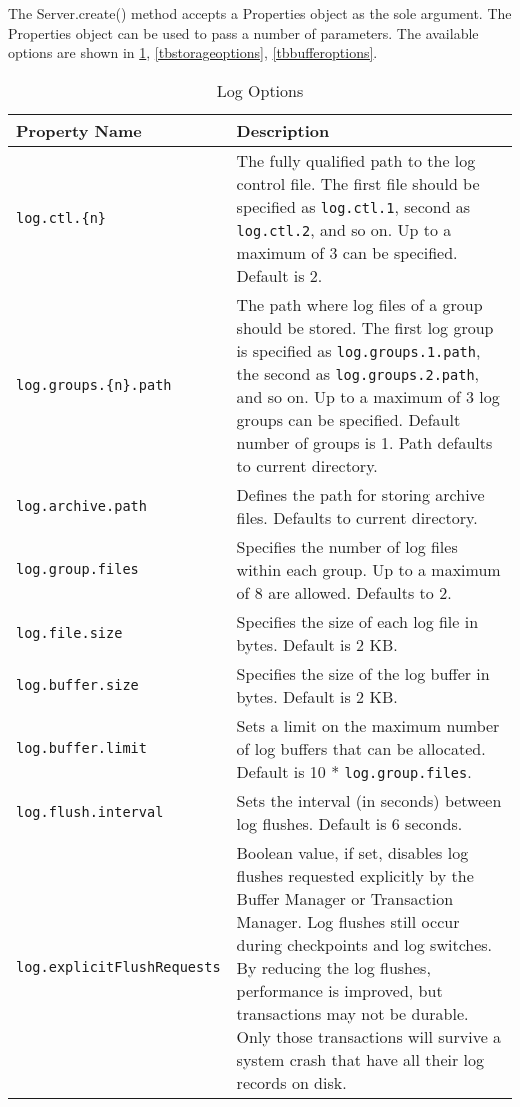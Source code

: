 \documentclass[a4paper,draft,oneside]{book}
\begin{document}
The Server.create() method accepts a Properties object as
the sole argument. The Properties object can be used to pass a
number of parameters. The available options are shown in
\ref{tblogoptions}, \ref{tbstorageoptions}, \ref{tbbufferoptions}. 

\clearpage
\begin{table}[tbp]
\begin{center}
\begin{tabular}{|l|p{6cm}|}
  \hline
  \textbf{Property Name}&\textbf{Description}  \\
  \hline 
  \verb|log.ctl.{n}|&The fully qualified path to the
  log control file. The first file should be specified as
  \verb|log.ctl.1|, second as \verb|log.ctl.2|, and so on. Up to a
  maximum of 3 can be specified. Default is 2. \\
  \hline
  \verb|log.groups.{n}.path|&The path where log
  files of a group should be stored. The first log group is specified
  as \verb|log.groups.1.path|, the second as \verb|log.groups.2.path|,
  and so on. Up to a maximum of 3 log groups can be specified. Default
  number of groups is 1. Path defaults to current directory.  \\
  \hline
  \verb|log.archive.path|&Defines the path for storing archive files. 
  Defaults to current directory.  \\
  \hline
  \verb|log.group.files|&Specifies the number of log files within each group.
  Up to a maximum of 8 are allowed. Defaults to 2. \\
  \hline 
  \verb|log.file.size|&Specifies the size of each log file in
  bytes. Default is 2 KB. \\
  \hline 
  \verb|log.buffer.size|&Specifies the size of the log buffer
  in bytes. Default is 2 KB. \\
  \hline 
  \verb|log.buffer.limit|&Sets a limit on the maximum number of
  log buffers that can be allocated. Default is 10 *
  \verb|log.group.files|.  \\
  \hline 
  \verb|log.flush.interval|&Sets the interval (in seconds)
  between log flushes. Default is 6 seconds.  \\
  \hline 
  \verb|log.explicitFlushRequests|&Boolean value, if set, disables 
  log flushes requested explicitly by the Buffer Manager or Transaction 
  Manager. Log flushes still occur during checkpoints and log switches. 
  By reducing the log flushes, performance is improved, but transactions 
  may not be durable. Only those transactions will survive a system crash 
  that have all their log records on disk.  \\
  \hline 
\end{tabular}
\end{center}
\caption{Log Options}
\label{tblogoptions}
\end{table}
\end{document}
